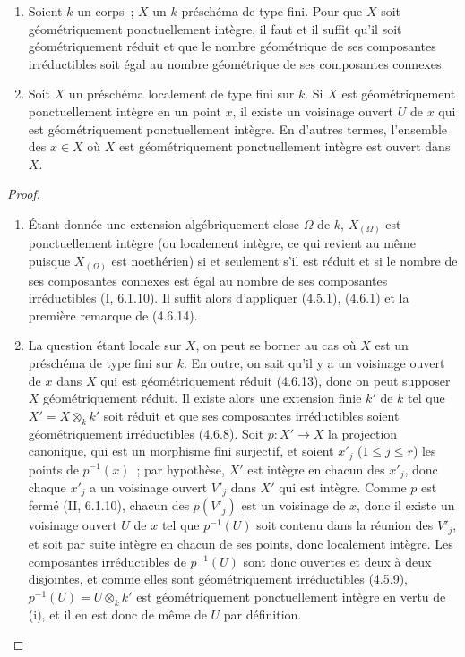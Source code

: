 \begin{proposition}[4.6.15]
\label{IV.2.4.6.15-fr}
\begin{enumerate}
\item[(i)] Soient $k$ un corps~; $X$ un $k$-préschéma de type fini. Pour que $X$
soit géométriquement ponctuellement intègre, il faut et il suffit qu'il soit
géométriquement réduit et que le nombre géométrique de ses composantes
irréductibles soit égal au nombre géométrique de ses composantes connexes.
\item[(ii)] Soit $X$ un préschéma localement de type fini sur $k$. Si $X$ est
géométriquement ponctuellement intègre en un point $x$, il existe un voisinage
ouvert $U$ de $x$ qui est géométriquement ponctuellement intègre. En d'autres
termes, l'ensemble des $x\in X$ où $X$ est géométriquement ponctuellement
intègre est ouvert dans $X$.
\end{enumerate}
\end{proposition}

\begin{proof}
\begin{enumerate}
\item[(i)] Étant donnée une extension algébriquement close $\Omega$ de $k$,
$X_{(\Omega)}$ est ponctuellement intègre (ou localement intègre, ce qui
revient au même puisque $X_{(\Omega)}$ est noethérien) si et seulement s'il est
réduit et si le nombre de ses composantes connexes est égal au nombre de ses
composantes irréductibles (I, 6.1.10). Il suffit alors d'appliquer (4.5.1),
(4.6.1) et la première remarque de (4.6.14).

\item[(ii)] La question étant locale sur $X$, on peut se borner au cas où $X$
est un préschéma de type fini sur $k$. En outre, on sait qu'il y a un voisinage
ouvert de $x$ dans $X$ qui est géométriquement réduit (4.6.13), donc on peut
supposer $X$ géométriquement réduit. Il existe alors une extension finie $k'$
de $k$ tel que $X'=X\otimes_k k'$ soit réduit et que ses composantes
irréductibles soient géométriquement irréductibles (4.6.8). Soit
$p:X'\to X$ la projection canonique, qui est un morphisme fini surjectif, et
soient $x'_j$ ($1\leqslant j\leqslant r$) les points de $p^{-1}(x)$~; par
hypothèse, $X'$ est intègre en chacun des $x'_j$, donc chaque $x'_j$ a un
voisinage ouvert $V'_j$ dans $X'$ qui est intègre. Comme $p$ est fermé
(II, 6.1.10), chacun des $p(V'_j)$ est un voisinage de $x$, donc il existe un
voisinage ouvert $U$ de $x$ tel que $p^{-1}(U)$ soit contenu dans la réunion
des $V'_j$, et soit par suite intègre en chacun de ses points, donc localement
intègre. Les composantes irréductibles de $p^{-1}(U)$ sont donc ouvertes et
deux à deux disjointes, et comme elles sont géométriquement irréductibles
(4.5.9), $p^{-1}(U)=U\otimes_k k'$ est géométriquement ponctuellement intègre
en vertu de (i), et il en est donc de même de $U$ par définition.
\end{enumerate}
\end{proof}

